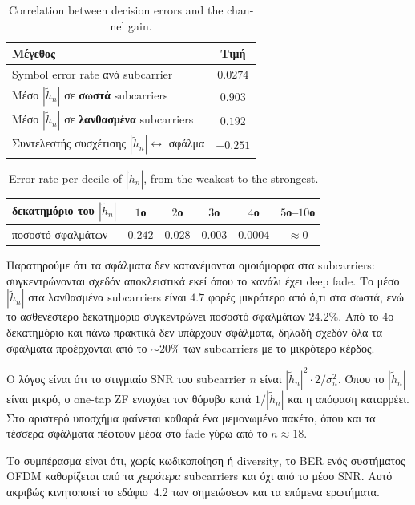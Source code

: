 \documentclass[11pt,a4paper]{article}
\newcommand{\en}[1]{\textenglish{#1}}
\newcommand{\SNR}{\en{SNR}}
\newcommand{\BER}{\en{BER}}
\begin{document}
\begin{table}[H]
  \centering\small
  \begin{tabular}{lc}
    \toprule
    Μέγεθος & Τιμή \\
    \midrule
    \en{Symbol error rate} ανά \en{subcarrier} & $0.0274$ \\
    Μέσο $|\tilde h_n|$ σε \textbf{σωστά} \en{subcarriers} & $0.903$ \\
    Μέσο $|\tilde h_n|$ σε \textbf{λανθασμένα} \en{subcarriers} & $0.192$ \\
    Συντελεστής συσχέτισης $|\tilde h_n| \leftrightarrow$ σφάλμα & $-0.251$ \\
    \bottomrule
  \end{tabular}
  \caption{\en{Correlation between decision errors and the channel gain.}}
\end{table}

\begin{table}[H]
  \centering\small
  \begin{tabular}{lccccc}
    \toprule
    δεκατημόριο του $|\tilde h_n|$ & $1$ο & $2$ο & $3$ο & $4$ο & $5$ο–$10$ο \\
    \midrule
    ποσοστό σφαλμάτων & $\mathbf{0.242}$ & $0.028$ & $0.003$ & $0.0004$ & $\approx 0$ \\
    \bottomrule
  \end{tabular}
  \caption{\en{Error rate per decile of $|\tilde h_n|$, from the weakest to the strongest.}}
\end{table}

Παρατηρούμε ότι τα σφάλματα δεν κατανέμονται ομοιόμορφα στα \en{subcarriers}:
συγκεντρώνονται σχεδόν αποκλειστικά εκεί όπου το κανάλι έχει \en{deep fade}. Το μέσο
$|\tilde h_n|$ στα λανθασμένα \en{subcarriers} είναι $4.7$ φορές μικρότερο από ό,τι στα
σωστά, ενώ το ασθενέστερο δεκατημόριο συγκεντρώνει ποσοστό σφαλμάτων $24.2\%$. Από το $4$ο
δεκατημόριο και πάνω πρακτικά δεν υπάρχουν σφάλματα, δηλαδή σχεδόν όλα τα σφάλματα
προέρχονται από το $\sim 20\%$ των \en{subcarriers} με το μικρότερο κέρδος.

Ο λόγος είναι ότι το στιγμιαίο \SNR{} του \en{subcarrier} $n$ είναι
$|\tilde h_n|^2 \cdot 2/\sigma_n^2$. Όπου το $|\tilde h_n|$ είναι μικρό, ο \en{one-tap ZF}
ενισχύει τον θόρυβο κατά $1/|\tilde h_n|$ και η απόφαση καταρρέει. Στο αριστερό υποσχήμα
φαίνεται καθαρά ένα μεμονωμένο πακέτο, όπου και τα τέσσερα σφάλματα πέφτουν μέσα στο
\en{fade} γύρω από το $n \approx 18$.

Το συμπέρασμα είναι ότι, χωρίς κωδικοποίηση ή \en{diversity}, το \BER{} ενός συστήματος
\en{OFDM} καθορίζεται από τα \emph{χειρότερα} \en{subcarriers} και όχι από το μέσο \SNR{}.
Αυτό ακριβώς κινητοποιεί το εδάφιο~4.2 των σημειώσεων και τα επόμενα ερωτήματα.
\end{document}
